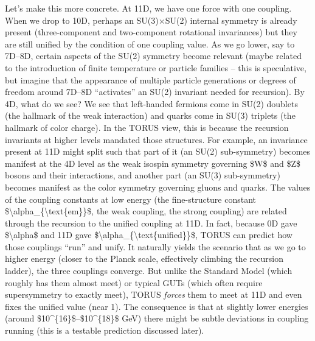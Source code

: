 \documentclass[
]{article}
\begin{document}
Let's make this more concrete. At 11D, we have one force with one
coupling. When we drop to 10D, perhaps an SU(3)×SU(2) internal symmetry
is already present (three-component and two-component rotational
invariances) but they are still unified by the condition of one coupling
value. As we go lower, say to 7D--8D, certain aspects of the SU(2)
symmetry become relevant (maybe related to the introduction of finite
temperature or particle families -- this is speculative, but imagine
that the appearance of multiple particle generations or degrees of
freedom around 7D--8D ``activates'' an SU(2) invariant needed for
recursion). By 4D, what do we see? We see that left-handed fermions come
in SU(2) doublets (the hallmark of the weak interaction) and quarks come
in SU(3) triplets (the hallmark of color charge). In the TORUS view,
this is because the recursion invariants at higher levels mandated those
structures. For example, an invariance present at 11D might split such
that part of it (an SU(2) sub-symmetry) becomes manifest at the 4D level
as the weak isospin symmetry governing \$W\$ and \$Z\$ bosons and their
interactions, and another part (an SU(3) sub-symmetry) becomes manifest
as the color symmetry governing gluons and quarks. The values of the
coupling constants at low energy (the fine-structure constant
\$\textbackslash alpha\_\{\textbackslash text\{em\}\}\$, the weak
coupling, the strong coupling) are related through the recursion to the
unified coupling at 11D. In fact, because 0D gave
\$\textbackslash alpha\$ and 11D gave
\$\textbackslash alpha\_\{\textbackslash text\{unified\}\}\$, TORUS can
predict how those couplings ``run'' and unify. It naturally yields the
scenario that as we go to higher energy (closer to the Planck scale,
effectively climbing the recursion ladder), the three couplings
converge. But unlike the Standard Model (which roughly has them almost
meet) or typical GUTs (which often require supersymmetry to exactly
meet), TORUS \emph{forces} them to meet at 11D and even fixes the
unified value (near 1). The consequence is that at slightly lower
energies (around \$10\^{}\{16\}\$--\$10\^{}\{18\}\$ GeV) there might be
subtle deviations in coupling running (this is a testable prediction
discussed later).
\end{document}
